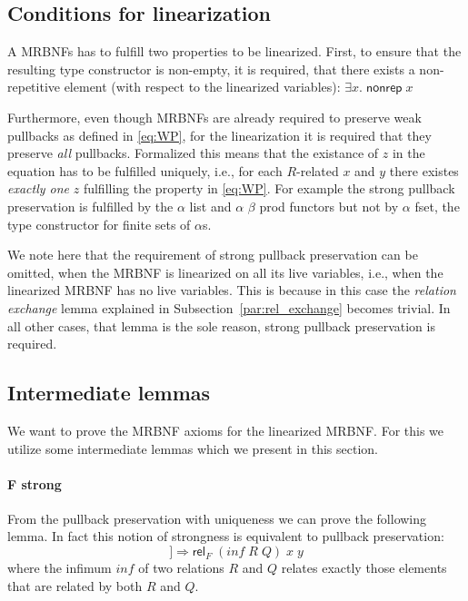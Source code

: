     
  \subsection{Conditions for linearization}
  \label{subsec:conditions}
    A \acp{MRBNF} has to fulfill two properties to be linearized. First, to ensure that the resulting type constructor is non-empty, it is required, that there exists a non-repetitive element (with respect to the linearized variables): $\exists x.\; \textsf{nonrep}\; x$

    Furthermore, even though \acp{MRBNF} are already required to preserve weak pullbacks as defined in \autoref{eq:WP}, for the linearization it is required that they preserve \textit{all} pullbacks. Formalized this means that the existance of $z$ in the equation has to be fulfilled uniquely, i.e., for each $R$-related $x$ and $y$ there existes \textit{exactly one} $z$ fulfilling the property in \autoref{eq:WP}. For example the strong pullback preservation is fulfilled by the \textsf{$\alpha$ list} and \textsf{$\alpha$ $\beta$ prod} functors but not by \textsf{$\alpha$ fset}, the type constructor for finite sets of $\alpha$s. 

    We note here that the requirement of strong pullback preservation can be omitted, when the \ac{MRBNF} is linearized on all its live variables, i.e., when the linearized \ac{MRBNF} has no live variables. This is because in this case the \textit{relation exchange} lemma explained in Subsection~\ref{par:rel_exchange} becomes trivial. In all other cases, that lemma is the sole reason, strong pullback preservation is required.

  \subsection{Intermediate lemmas}
    We want to prove the \ac{MRBNF} axioms for the linearized \ac{MRBNF}. For this we utilize some intermediate lemmas which we present in this section.
    
    \paragraph{F strong}
      From the pullback preservation with uniqueness we can prove the following lemma. In fact this notion of strongness is equivalent to pullback preservation: 
      \begin{equation*}
        [\![\textsf{rel}_F\; R\; x\; y;\; \textsf{rel}_F\; Q\; x\; y]\!] \Longrightarrow \textsf{rel}_F\; (inf\; R\; Q)\; x\; y
      \end{equation*} 
      where the infimum $inf$ of two relations $R$ and $Q$ relates exactly those elements that are related by both $R$ and $Q$.

